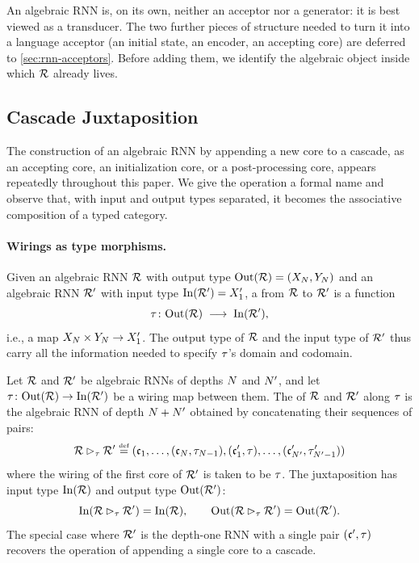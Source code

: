 \documentclass{article}
\begin{document}
An algebraic RNN is, on its own, neither an acceptor nor a generator: it is best viewed as a transducer.
The two further pieces of structure needed to turn it into a language acceptor (an initial state, an encoder, an accepting core) are deferred to \cref{sec:rnn-acceptors}.
Before adding them, we identify the algebraic object inside which $\mathcal{R}$ already lives.

\subsection{Cascade Juxtaposition}\label{sec:juxtaposition}

The construction of an algebraic RNN by appending a new core to a cascade, as an accepting core, an initialization core, or a post-processing core, appears repeatedly throughout this paper.
We give the operation a formal name and observe that, with input and output types separated, it becomes the associative composition of a typed category.

\paragraph{Wirings as type morphisms.}
Given an algebraic RNN $\mathcal{R}$ with output type $\mathrm{Out}(\mathcal{R}) = (X_N, Y_N)$ and an algebraic RNN $\mathcal{R}'$ with input type $\mathrm{In}(\mathcal{R}') = X_1'$, a  from $\mathcal{R}$ to $\mathcal{R}'$ is a function
$$ \tau \colon \mathrm{Out}(\mathcal{R}) \;\longrightarrow\; \mathrm{In}(\mathcal{R}'), $$
i.e., a map $X_N \times Y_N \to X_1'$.
The output type of $\mathcal{R}$ and the input type of $\mathcal{R}'$ thus carry all the information needed to specify $\tau$'s domain and codomain.

\begin{definition}\label{def:juxtaposition}
Let $\mathcal{R}$ and $\mathcal{R}'$ be algebraic RNNs of depths $N$ and $N'$, and let $\tau \colon \mathrm{Out}(\mathcal{R}) \to \mathrm{In}(\mathcal{R}')$ be a wiring map between them.
The  of $\mathcal{R}$ and $\mathcal{R}'$ along $\tau$ is the algebraic RNN of depth $N + N'$ obtained by concatenating their sequences of pairs: 
$$  \mathcal{R} \mathbin{\rhd_{\tau}} \mathcal{R}' \mathrel{\stackrel{\textnormal{\tiny def}}{=}} (\mathfrak{c}_1,  \dots,  (\mathfrak{c}_N, \tau_{N-1}),  (\mathfrak{c}_1', \tau),  \dots,  (\mathfrak{c}_{N'}', \tau_{N'-1}')  ) $$
where the wiring of the first core of $\mathcal{R}'$ is taken to be $\tau$.
The juxtaposition has input type $\mathrm{In}(\mathcal{R})$ and output type $\mathrm{Out}(\mathcal{R}')$:
$$ \mathrm{In}(\mathcal{R} \mathbin{\rhd_{\tau}} \mathcal{R}') = \mathrm{In}(\mathcal{R}), \qquad \mathrm{Out}(\mathcal{R} \mathbin{\rhd_{\tau}} \mathcal{R}') = \mathrm{Out}(\mathcal{R}'). $$ 
The special case where $\mathcal{R}'$ is the depth-one RNN with a single pair $(\mathfrak{c}', \tau)$ recovers the operation of appending a single core to a cascade.
\end{definition}
\end{document}
